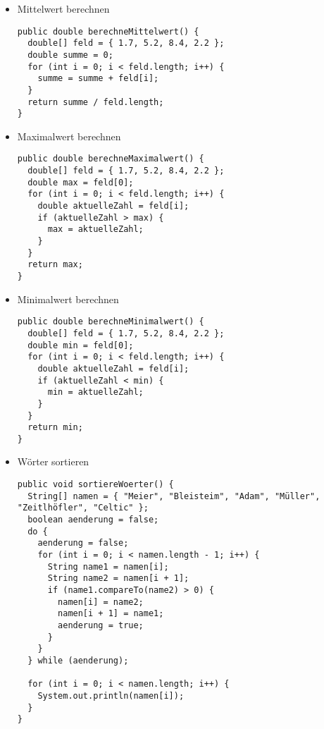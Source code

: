 \documentclass{lehramt-informatik-haupt}
\begin{document}
\begin{itemize}

%

\item Mittelwert berechnen

\begin{verbatim}
public double berechneMittelwert() {
  double[] feld = { 1.7, 5.2, 8.4, 2.2 };
  double summe = 0;
  for (int i = 0; i < feld.length; i++) {
    summe = summe + feld[i];
  }
  return summe / feld.length;
}
\end{verbatim}

%

\item Maximalwert berechnen

\begin{verbatim}
public double berechneMaximalwert() {
  double[] feld = { 1.7, 5.2, 8.4, 2.2 };
  double max = feld[0];
  for (int i = 0; i < feld.length; i++) {
    double aktuelleZahl = feld[i];
    if (aktuelleZahl > max) {
      max = aktuelleZahl;
    }
  }
  return max;
}
\end{verbatim}

%

\item Minimalwert berechnen

\begin{verbatim}
public double berechneMinimalwert() {
  double[] feld = { 1.7, 5.2, 8.4, 2.2 };
  double min = feld[0];
  for (int i = 0; i < feld.length; i++) {
    double aktuelleZahl = feld[i];
    if (aktuelleZahl < min) {
      min = aktuelleZahl;
    }
  }
  return min;
}
\end{verbatim}

%

\item Wörter sortieren

\begin{verbatim}
public void sortiereWoerter() {
  String[] namen = { "Meier", "Bleisteim", "Adam", "Müller", "Zeitlhöfler", "Celtic" };
  boolean aenderung = false;
  do {
    aenderung = false;
    for (int i = 0; i < namen.length - 1; i++) {
      String name1 = namen[i];
      String name2 = namen[i + 1];
      if (name1.compareTo(name2) > 0) {
        namen[i] = name2;
        namen[i + 1] = name1;
        aenderung = true;
      }
    }
  } while (aenderung);

  for (int i = 0; i < namen.length; i++) {
    System.out.println(namen[i]);
  }
}
\end{verbatim}


\end{itemize}
\end{document}
